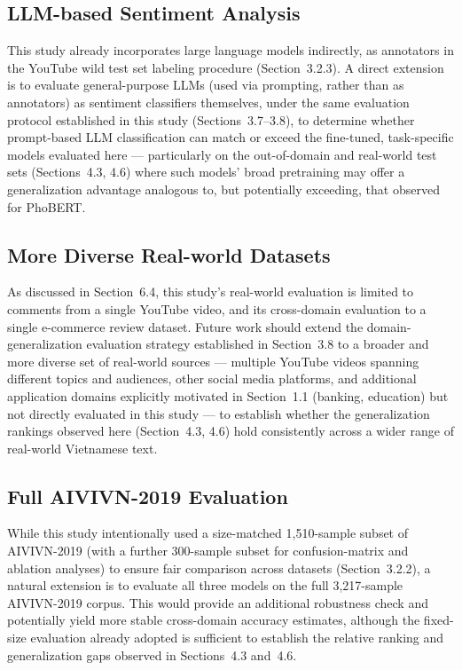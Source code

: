 \documentclass[12pt]{report} %
\begin{document}
\subsection{LLM-based Sentiment Analysis}
This study already incorporates large language models indirectly, as annotators in the YouTube wild test set labeling procedure (Section~3.2.3). A direct extension is to evaluate general-purpose LLMs (used via prompting, rather than as annotators) as sentiment classifiers themselves, under the same evaluation protocol established in this study (Sections~3.7--3.8), to determine whether prompt-based LLM classification can match or exceed the fine-tuned, task-specific models evaluated here --- particularly on the out-of-domain and real-world test sets (Sections~4.3, 4.6) where such models' broad pretraining may offer a generalization advantage analogous to, but potentially exceeding, that observed for PhoBERT.

\subsection{More Diverse Real-world Datasets}
As discussed in Section~6.4, this study's real-world evaluation is limited to comments from a single YouTube video, and its cross-domain evaluation to a single e-commerce review dataset. Future work should extend the domain-generalization evaluation strategy established in Section~3.8 to a broader and more diverse set of real-world sources --- multiple YouTube videos spanning different topics and audiences, other social media platforms, and additional application domains explicitly motivated in Section~1.1 (banking, education) but not directly evaluated in this study --- to establish whether the generalization rankings observed here (Section~4.3, 4.6) hold consistently across a wider range of real-world Vietnamese text.

\subsection{Full AIVIVN-2019 Evaluation}
\label{subsec:full-aivivn-eval}
While this study intentionally used a size-matched 1,510-sample subset of AIVIVN-2019 (with a further 300-sample subset for confusion-matrix and ablation analyses) to ensure fair comparison across datasets (Section~3.2.2), a natural extension is to evaluate all three models on the full 3,217-sample AIVIVN-2019 corpus. This would provide an additional robustness check and potentially yield more stable cross-domain accuracy estimates, although the fixed-size evaluation already adopted is sufficient to establish the relative ranking and generalization gaps observed in Sections~4.3 and~4.6.
\end{document}

